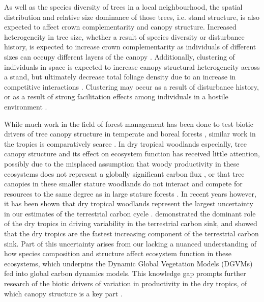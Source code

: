 \documentclass[11pt,a4paper]{article}
\begin{document}
As well as the species diversity of trees in a local neighbourhood, the spatial distribution and relative size dominance of those trees, i.e. stand structure, is also expected to affect crown complementarity and canopy structure. Increased heterogeneity in tree size, whether a result of species diversity or disturbance history, is expected to increase crown complementarity as individuals of different sizes can occupy different layers of the canopy \citep{}. Additionally, clustering of individuals in space is expected to increase canopy structural heterogeneity across a stand, but ultimately decrease total foliage density due to an increase in competitive interactions \citep{}. Clustering may occur as a result of disturbance history, or as a result of strong facilitation effects among individuals in a hostile environment \citep{Ratcliffe2017}.

While much work in the field of forest management has been done to test biotic drivers of tree canopy structure in temperate \citep{} and boreal forests \citep{}, similar work in the tropics is comparatively scarce \citep{}. In dry tropical woodlands especially, tree canopy structure and its effect on ecosystem function has received little attention, possibly due to the misplaced assumption that woody productivity in these ecosystems does not represent a globally significant carbon flux \citep{}, or that tree canopies in these smaller stature woodlands do not interact and compete for resources to the same degree as in large stature forests \citep{}. In recent years however, it has been shown that dry tropical woodlands represent the largest uncertainty in our estimates of the terrestrial carbon cycle \citep{Quere2018, Ahlstrom2015}. \citet{Sitch2015} demonstrated the dominant role of the dry tropics in driving variability in the terrestrial carbon sink, and showed that the dry tropics are the fastest increasing component of the terrestrial carbon sink. Part of this uncertainty arises from our lacking a nuanced understanding of how species composition and structure affect ecosystem function in these ecosystems, which underpins the Dynamic Global Vegetation Models (DGVMs) fed into global carbon dynamics models. This knowledge gap prompts further research of the biotic drivers of variation in productivity in the dry tropics, of which canopy structure is a key part \citep{}.
\end{document}

